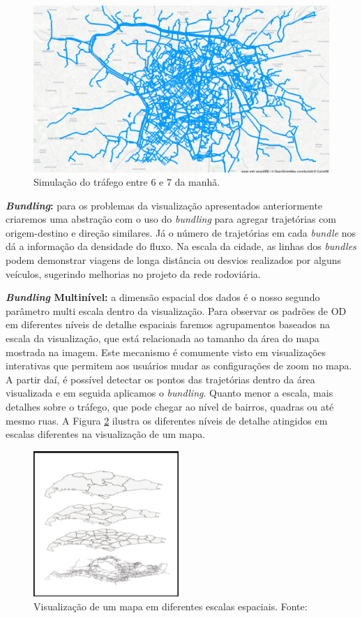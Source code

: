 \begin{figure}[!htb]
  \centering
  \includegraphics[width=1\textwidth]{../figuras/trafego-ocluso.png}
  \caption{Simulação do tráfego entre 6 e 7 da manhã.}
  \label{fig:simulated-traffic}
\end{figure}

\textbf{\emph{Bundling}:} para os problemas da visualização apresentados
anteriormente criaremos uma abstração com o uso do \emph{bundling} para agregar
trajetórias com origem-destino e direção similares. Já o número de trajetórias
em cada \emph{bundle} nos dá a informação da densidade do fluxo. Na escala da
cidade, as linhas dos \emph{bundles} podem demonstrar viagens de longa
distância ou desvios realizados por alguns veículos, sugerindo melhorias no
projeto da rede rodoviária.

\textbf{\emph{Bundling} Multinível:} a dimensão espacial dos dados é o nosso
segundo parâmetro multi escala dentro da visualização. Para observar os padrões
de OD em diferentes níveis de detalhe espaciais faremos agrupamentos baseados
na escala da visualização, que está relacionada ao tamanho da área do mapa
mostrada na imagem. Este mecanismo é comumente visto em visualizações
interativas que permitem aos usuários mudar as configurações de zoom no mapa. A
partir daí, é possível detectar os pontos das trajetórias dentro da área
visualizada e em seguida aplicamos o \emph{bundling}. Quanto menor a escala,
mais detalhes sobre o tráfego, que pode chegar ao nível de bairros, quadras ou
até mesmo ruas. A Figura \ref{fig:multi-scale} ilustra os diferentes níveis de
detalhe atingidos em escalas diferentes na visualização de um mapa.

\begin{figure}[!htb]
  \centering
  \includegraphics[width=55mm]{../figuras/multi-scale.png}
  \caption[Visualização de um mapa em diferentes escalas espaciais]{Visualização de um mapa em diferentes escalas espaciais. Fonte: \citet{Zeng2013}}
  \label{fig:multi-scale}
\end{figure}

